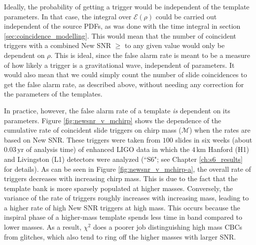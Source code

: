Ideally, the probability of getting a trigger would be independent of the template parameters. In that case, the integral over $\mathcal{E}(\rho)$ could be carried out independent of the source \acp{PDF}, as was done with the time integral in section \ref{sec:coincidence_modelling}. This would mean that the number of coincident triggers with a combined New \ac{SNR} $\geq$ to any given value would only be dependent on $\rho$. This is ideal, since the false alarm rate is meant to be a measure of how likely a trigger is a gravitational wave, independent of parameters. It would also mean that we could simply count the number of slide coincidences to get the false alarm rate, as described above, without needing any correction for the parameters of the templates.

In practice, however, the false alarm rate of a template \emph{is} dependent on its parameters. Figure \ref{fig:newsnr_v_mchirp} shows the dependence of the cumulative rate of coincident slide triggers on chirp mass ($\mathcal{M}$) when the rates are based on New \ac{SNR}. These triggers were taken from $100$ slides in six weeks (about $0.03\,\mathrm{yr}$ of analysis time) of enhanced \ac{LIGO} data in which the $4\,\mathrm{km}$ Hanford (H1) and Livingston (L1) detectors were analyzed (``S6"; see Chapter \ref{ch:s6_results} for details). As can be seen in Figure \ref{fig:newsnr_v_mchirp-a}, the overall rate of triggers decreases with increasing chirp mass. This is due to the fact that the template bank is more sparsely populated at higher masses. Conversely, the variance of the rate of triggers roughly increases with increasing mass, leading to a higher rate of high New \ac{SNR} triggers at high mass. This occurs because the inspiral phase of a higher-mass template spends less time in band compared to lower masses. As a result, $\chi^2$ does a poorer job distinguishing high mass \acp{CBC} from glitches, which also tend to ring off the higher masses with larger \ac{SNR}.

